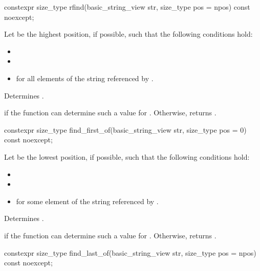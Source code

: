 %
\begin{itemdecl}
constexpr size_type rfind(basic_string_view str, size_type pos = npos) const noexcept;
\end{itemdecl}

\begin{itemdescr}
\pnum
Let  be the highest position, if possible, such that the following conditions hold:
\begin{itemize}
\item
{}
\item
{}
\item
{} for all elements  of the string referenced by .
\end{itemize}

\pnum
\effects
Determines .

\pnum
\returns
{} if the function can determine such a value for .
Otherwise, returns .
\end{itemdescr}

%
\begin{itemdecl}
constexpr size_type find_first_of(basic_string_view str, size_type pos = 0) const noexcept;
\end{itemdecl}

\begin{itemdescr}
\pnum
Let  be the lowest position, if possible, such that the following conditions hold:
\begin{itemize}
\item
{}
\item
{}
\item
{} for some element  of the string referenced by .
\end{itemize}

\pnum
\effects
Determines .

\pnum
\returns
{} if the function can determine such a value for .
Otherwise, returns .
\end{itemdescr}

%
\begin{itemdecl}
constexpr size_type find_last_of(basic_string_view str, size_type pos = npos) const noexcept;
\end{itemdecl}

